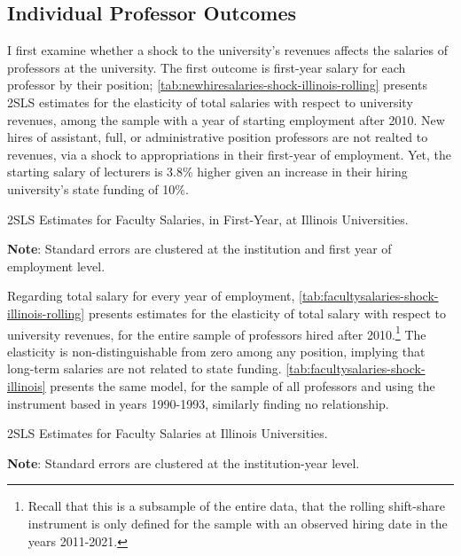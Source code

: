 \documentclass[notitlepage,12pt]{article}
\begin{document}
\subsection{Individual Professor Outcomes}

I first examine whether a shock to the university's revenues affects the salaries of professors at the university.
The first outcome is first-year salary for each professor by their position;
\autoref{tab:newhiresalaries-shock-illinois-rolling} presents 2SLS estimates for the elasticity of total salaries with respect to university revenues, among the sample with a year of starting employment after 2010.
New hires of assistant, full, or administrative position professors are not realted to revenues, via a shock to appropriations in their first-year of employment.
Yet, the starting salary of lecturers is 3.8\% higher given an increase in their hiring university's state funding of 10\%.

\begin{table}[h!]
    \singlespacing
    \centering
    \caption{2SLS Estimates for Faculty Salaries, in First-Year, at Illinois Universities.}
    \makebox[\textwidth][c]{}
    \begin{flushleft}
        \footnotesize
        \textbf{Note}: Standard errors are clustered at the institution and first year of employment level. 
    \end{flushleft}
    \label{tab:newhiresalaries-shock-illinois-rolling}
\end{table}

Regarding total salary for every year of employment, \autoref{tab:facultysalaries-shock-illinois-rolling} presents estimates for the elasticity of total salary with respect to university revenues, for the entire sample of professors hired after 2010.\footnote{
    Recall that this is a subsample of the entire data, that the rolling shift-share instrument is only defined for the sample with an observed hiring date in the years 2011-2021.
}
The elasticity is non-distinguishable from zero among any position, implying that long-term salaries are not related to state funding.
\autoref{tab:facultysalaries-shock-illinois} presents the same model, for the sample of all professors and using the instrument based in years 1990-1993, similarly finding no relationship.

\begin{table}[h!]
    \singlespacing
    \centering
    \caption{2SLS Estimates for Faculty Salaries at Illinois Universities.}
    \makebox[\textwidth][c]{}
    \begin{flushleft}
        \footnotesize
        \textbf{Note}: Standard errors are clustered at the institution-year level.
    \end{flushleft}
    \label{tab:facultysalaries-shock-illinois-rolling}
\end{table}
\end{document}
